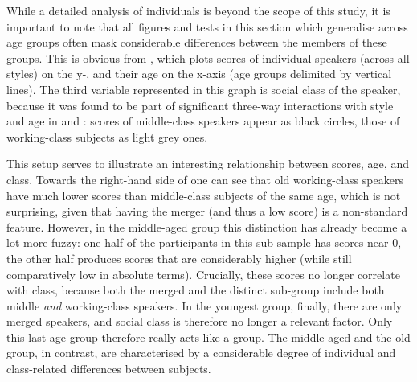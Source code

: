 While a detailed analysis of individuals is beyond the scope of this study, it is important to note that all figures and tests in this section which generalise across age groups often mask considerable differences between the members of these groups.
This is obvious from , which plots  scores of individual speakers (across all styles) on the y-, and their age on the x-axis (age groups delimited by vertical lines).
The third variable represented in this graph is social class of the speaker, because it was found to be part of significant three-way interactions with style and age in  and :  scores of middle-class speakers appear as black circles, those of working-class subjects as light grey ones.

\newpage 
This setup serves to illustrate an interesting relationship between  scores, age, and class.
Towards the right-hand side of  one can see that old working-class speakers have much lower  scores than middle-class subjects of the same age, which is not surprising, given that having the merger (and thus a low  score) is a non-standard feature.
However, in the middle-aged group this distinction has already become a lot more fuzzy: one half of the participants in this sub-sample has  scores near 0, the other half produces scores that are considerably higher (while still comparatively low in absolute terms).
Crucially, these scores no longer correlate with class, because both the merged and the distinct sub-group include both middle \emph{and} working-class speakers.
In the youngest group, finally, there are only merged speakers, and social class is therefore no longer a relevant factor.
Only this last age group therefore really acts like a group.
The middle-aged and the old group, in contrast, are characterised by a considerable degree of individual and class-related differences between subjects.